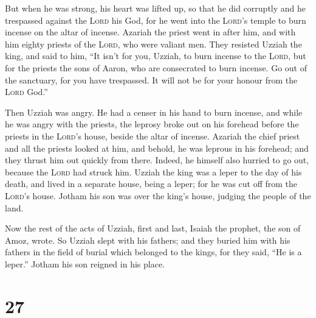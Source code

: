  But when he was strong, his heart was lifted up, so that
he did corruptly and he trespassed against the \textsc{Lord} his God,
for he went into the \textsc{Lord}'s temple to burn incense on the altar
of incense.  Azariah the priest went in after him, and
with him eighty priests of the \textsc{Lord}, who were valiant men.
 They resisted Uzziah the king, and said to him, ``It
isn't for you, Uzziah, to burn incense to the \textsc{Lord}, but for the
priests the sons of Aaron, who are consecrated to burn incense. Go out
of the sanctuary, for you have trespassed. It will not be for your
honour from the \textsc{Lord} God.''

 Then Uzziah was angry. He had a censer in his hand to
burn incense, and while he was angry with the priests, the leprosy broke
out on his forehead before the priests in the \textsc{Lord}'s house,
beside the altar of incense.  Azariah the chief priest
and all the priests looked at him, and behold, he was leprous in his
forehead; and they thrust him out quickly from there. Indeed, he himself
also hurried to go out, because the \textsc{Lord} had struck him.
 Uzziah the king was a leper to the day of his death, and
lived in a separate house, being a leper; for he was cut off from the
\textsc{Lord}'s house. Jotham his son was over the king's house, judging
the people of the land.

 Now the rest of the acts of Uzziah, first and last,
Isaiah the prophet, the son of Amoz, wrote.  So Uzziah
slept with his fathers; and they buried him with his fathers in the
field of burial which belonged to the kings, for they said, ``He is a
leper.'' Jotham his son reigned in his place.

\hypertarget{section-26}{%
\section{27}\label{section-26}}

